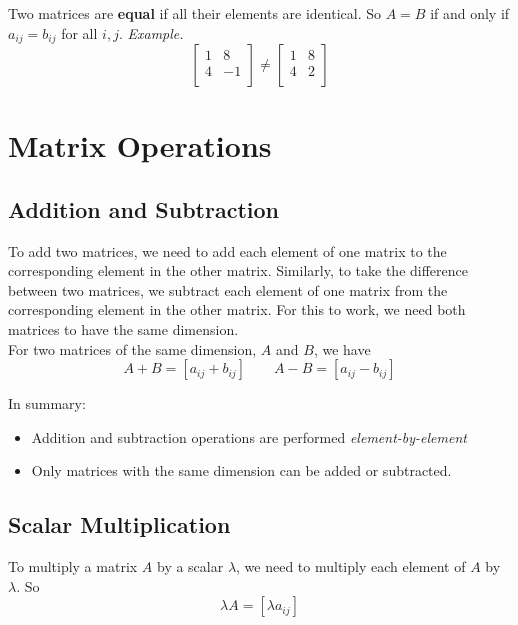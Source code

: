 \documentclass{./../Latex/handout}
\begin{document}
Two matrices are \textbf{equal} if all their elements are identical. So $A=B$ if and only if $a_{ij} = b_{ij}$ for all $i, j$.
\textit{Example.}
$$ \begin{bmatrix}
1 & 8  \\
4 &-1  \\
\end{bmatrix} \neq
 \begin{bmatrix}
1 & 8  \\
4 & 2  \\
\end{bmatrix}$$ 


\section{Matrix Operations}

\subsection{Addition and Subtraction}

To add two matrices, we need to add each element of one matrix to the corresponding element in the other matrix. Similarly, to take the difference between two matrices, we subtract each element of one matrix from the corresponding element in the other matrix. For this to work, we need both matrices to have the same dimension. \\

For two matrices of the same dimension, $A$ and $B$, we have 
$$ A + B = [a_{ij}+b_{ij}] \quad \quad A - B = [a_{ij}-b_{ij}] $$


In summary:
\begin{itemize}
\item Addition and subtraction operations are performed \textit{element-by-element}
\item Only matrices with the same dimension can be added or subtracted. 
\end{itemize}

\subsection{Scalar Multiplication}

To multiply a matrix $A$ by a scalar $\lambda$, we need to multiply each element of $A$ by  $\lambda$. So $$ \lambda A = [\lambda a_{ij}]$$ \\
\end{document}
